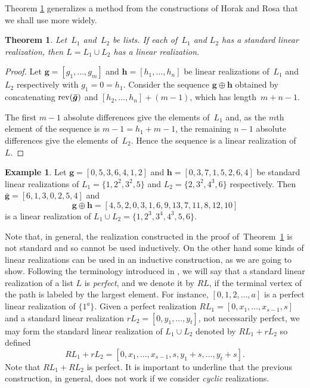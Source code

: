\documentclass{amsart}
\newtheorem{thm}[prop]{Theorem}
\theoremstyle{definition}
\newtheorem{ex}[prop]{Example}
\numberwithin{equation}{section}
\newcommand{\rev}{\mathop{\rm rev}\nolimits}
\def\ol{\oplus}
\begin{document}
Theorem \ref{th:2lr} generalizes a method from the constructions of Horak and Rosa \cite{HR} that we shall use more widely. 

\begin{thm}\label{th:2lr}
Let~$L_1$ and~$L_2$ be lists.  If each of~$L_1$ and $L_2$ has a standard linear realization, then $L = L_1 \cup L_2$ has a linear realization.
\end{thm}

\begin{proof}
Let $\bm{g} = [g_1, \ldots, g_m]$ and $\bm{h} = [h_1, \ldots, h_n]$ be linear realizations of~$L_1$ and~$L_2$
respectively with $g_1 = 0 = h_1$.  Consider the sequence $\bm{g}\ol \bm{h}$ obtained by concatenating
$\rev(\bm{ \bar{g}} )$ and $[h_2, \ldots, h_n] + (m-1)$, which has length~$m+n-1$.

The first $m-1$ absolute differences give the elements of~$L_1$ and, as the $m$th element of the sequence is $m-1 = h_1 + m-1$, the remaining $n -1$ absolute differences give the elements of~$L_2$.  Hence the sequence is a linear realization of~$L$.
\end{proof}


\begin{ex}
Let $\bm{g}=[0,5,3,6,4,1,2]$ and $\bm{h}=[0,3,7,1,5,2,6,4]$ be standard linear realizations of
$L_1=\{1,2^2,3^2,5\}$ and $L_2=\{2,3^2,4^3,6\}$ respectively.
Then $\bm{ \bar{g}}=[6,1,3,0,2,5,4]$ and
$$\bm{g}\ol\bm{h}=[4,5,2,0,3,1,6, 9,13,7,11,8,12,10  ]$$
is a linear realization of $L_1\cup L_2=\{ 1,2^3,3^4,4^3,5,6\}$.
\end{ex}

Note that, in general, the realization constructed in the proof of~Theorem~\ref{th:2lr} is not standard and so cannot be used inductively.
On the other hand some kinds of linear
realizations can be used in an inductive construction, as we are going to show.
Following the terminology  introduced in \cite{CDF}, we will say that a standard linear realization of a list $L$ is \emph{perfect},
and we denote it by $RL$,
if the terminal vertex of the path is labeled by the largest element.
For instance, $[0,1,2,\ldots,a]$ is a perfect linear realization of $\{1^a\}$.
Given a perfect realization
$RL_1=[0,x_1,\ldots,x_{s-1},s]$
and a standard linear realization
$rL_2=[0,y_1,\ldots,y_t]$, not necessarily perfect, we may
form the standard linear realization of
$L_1\cup L_2$ denoted by $RL_1+rL_2$ so defined
$$RL_1+rL_2=[0,x_1,\ldots,x_{s-1},s,y_1+s,\ldots,y_t+s].$$
Note that $RL_1+RL_2$ is perfect.
It is important to underline that the previous construction, in general, does not work if
we consider \emph{cyclic} realizations.
\end{document}
